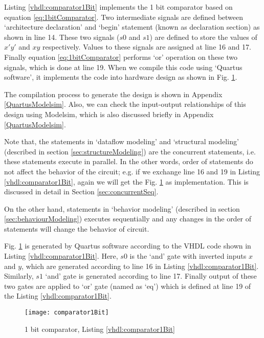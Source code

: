 \begin{explanation}
	Listing \ref{vhdl:comparator1Bit} implements the 1 bit comparator based on equation \ref{eq:1bitComparator}. Two intermediate signals are defined between `architecture declaration' and `begin' statement (known as declaration section) as shown in line 14. These two signals ($s0$ and $s1$) are defined to store the values of $x'y'$ and $xy$ respectively. Values to these signals are assigned at line 16 and 17. Finally equation \ref{eq:1bitComparator} performs `or' operation on these two signals, which is done at line 19. When we compile this code using `Quartus software', it implements the code into hardware design as shown in Fig. \ref{fig:comparator1Bit}.
	
	The compilation process to generate the design is shown in Appendix \ref{QuartusModelsim}. Also, we can check the input-output relationships of this design using Modelsim, which is also discussed briefly in Appendix \ref{QuartusModelsim}.   
\end{explanation}


\begin{noNumBox}
	Note that, the statements in `dataflow modeling' and `structural modeling' (described in section \ref{sec:structureModeling}) are the concurrent statements, i.e. these statements execute in parallel. In the other words, order of statements do not affect the behavior of the circuit; e.g. if we exchange line 16 and 19 in Listing \ref{vhdl:comparator1Bit}, again we will get the Fig. \ref{fig:comparator1Bit} as implementation. This is discussed in detail in Section \ref{sec:concurrentSeq}. 
	
	On the other hand, statements in `behavior modeling' (described in section \ref{sec:behaviourModeling}) executes sequentially and any changes in the order of statements will change the behavior of circuit. 
\end{noNumBox}

\begin{explanation}
	Fig. \ref{fig:comparator1Bit} is generated by Quartus software according to the VHDL code shown in Listing \ref{vhdl:comparator1Bit}. Here, $s0$ is the `and' gate with inverted inputs $x$ and $y$, which are generated according to line 16 in Listing \ref{vhdl:comparator1Bit}. Similarly,  $s1$ `and' gate is generated according to line 17. Finally output of these two gates are applied to `or' gate (named as `eq') which is defined at line 19 of the Listing \ref{vhdl:comparator1Bit}.   
\end{explanation}
\begin{figure}[!h]
	\centering
	\texttt{[image: comparator1Bit]}
	\caption{1 bit comparator, Listing \ref{vhdl:comparator1Bit}}
	\label{fig:comparator1Bit}
\end{figure}

